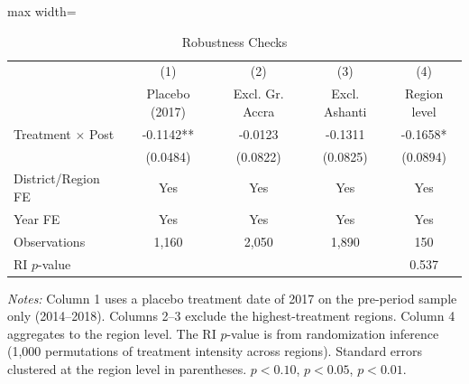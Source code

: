 \begin{table}[htbp]
\centering
\caption{Robustness Checks}
\label{tab:robustness}
\begin{adjustbox}{max width=\textwidth}
\begin{tabular}{lcccc}
\toprule
 & (1) & (2) & (3) & (4) \\
 & Placebo (2017) & Excl. Gr. Accra & Excl. Ashanti & Region level \\
\midrule
Treatment $\times$ Post & -0.1142** & -0.0123 & -0.1311 & -0.1658* \\
 & (0.0484) & (0.0822) & (0.0825) & (0.0894) \\
\addlinespace
\midrule
District/Region FE & Yes & Yes & Yes & Yes \\
Year FE & Yes & Yes & Yes & Yes \\
Observations & 1,160 & 2,050 & 1,890 & 150 \\
RI $p$-value & & & & 0.537 \\
\bottomrule
\end{tabular}
\end{adjustbox}
\par\vspace{0.3em}
{\footnotesize \textit{Notes:} Column 1 uses a placebo treatment date of 2017 on the pre-period sample only (2014--2018). Columns 2--3 exclude the highest-treatment regions. Column 4 aggregates to the region level. The RI $p$-value is from randomization inference (1,000 permutations of treatment intensity across regions). Standard errors clustered at the region level in parentheses. \sym{*} $p<0.10$, \sym{**} $p<0.05$, \sym{***} $p<0.01$.
}
\end{table}

